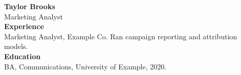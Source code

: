 \documentclass[letterpaper,11pt]{article}
\begin{document}
{\Large\bfseries Taylor Brooks}\\[2pt]
Marketing Analyst
\vspace{6pt}\\
\textbf{Experience}\\
Marketing Analyst, Example Co. Ran campaign reporting and attribution models.
\vspace{6pt}\\
\textbf{Education}\\
BA, Communications, University of Example, 2020.
\end{document}
